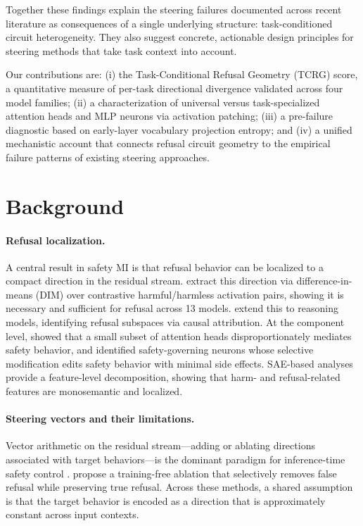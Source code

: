 \documentclass[11pt]{article}
\newcommand{\tcrg}{\textsc{TCRG}}
\begin{document}
Together these findings explain the steering failures documented across recent literature as consequences of a single underlying structure: task-conditioned circuit heterogeneity. They also suggest concrete, actionable design principles for steering methods that take task context into account.

Our contributions are: (i) the Task-Conditional Refusal Geometry (\tcrg{}) score, a quantitative measure of per-task directional divergence validated across four model families; (ii) a characterization of universal versus task-specialized attention heads and MLP neurons via activation patching; (iii) a pre-failure diagnostic based on early-layer vocabulary projection entropy; and (iv) a unified mechanistic account that connects refusal circuit geometry to the empirical failure patterns of existing steering approaches.

\section{Background}
\label{sec:background}

\paragraph{Refusal localization.}
A central result in safety MI is that refusal behavior can be localized to a compact direction in the residual stream. \citet{arditi2024refusal} extract this direction via difference-in-means (DIM) over contrastive harmful/harmless activation pairs, showing it is necessary and sufficient for refusal across 13 models. \citet{zhao2025refusal} extend this to reasoning models, identifying refusal subspaces via causal attribution. At the component level, \citet{zhou2025safety} showed that a small subset of attention heads disproportionately mediates safety behavior, and \citet{zhao2025d} identified safety-governing neurons whose selective modification edits safety behavior with minimal side effects. SAE-based analyses \citep{templeton2024scaling,yeo2025sae,goyal2025detox} provide a feature-level decomposition, showing that harm- and refusal-related features are monosemantic and localized.

\paragraph{Steering vectors and their limitations.}
Vector arithmetic on the residual stream---adding or ablating directions associated with target behaviors---is the dominant paradigm for inference-time safety control \citep{zou2023representation,panickssery2023steering}. \citet{wangf2025refusal} propose a training-free ablation that selectively removes false refusal while preserving true refusal. Across these methods, a shared assumption is that the target behavior is encoded as a direction that is approximately constant across input contexts.
\end{document}
